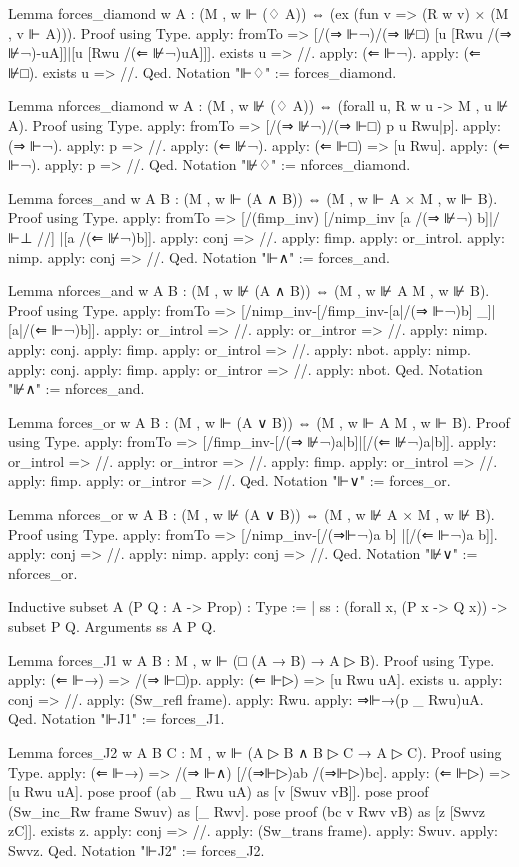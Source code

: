 \begin{spverbatim}
Lemma forces_diamond {w A} :
  (M , w ⊩ (♢ A)) ⇔ (ex (fun v => (R w v) × (M , v ⊩ A))).
Proof using Type.
  apply: fromTo => [/(⇒ ⊩¬)/(⇒ ⊮□) [u [Rwu /(⇒ ⊮¬)-uA]]|[u [Rwu /(⇐ ⊮¬)uA]]].
  exists u => //. apply: (⇐ ⊩¬). apply: (⇐ ⊮□). exists u => //.
Qed.
Notation "⊩♢" := forces_diamond.

Lemma nforces_diamond {w A} :
  (M , w ⊮ (♢ A)) ⇔ (forall {u}, R w u -> M , u ⊮ A).
Proof using Type.
  apply: fromTo => [/(⇒ ⊮¬)/(⇒ ⊩□) p u Rwu|p].
  apply: (⇒ ⊩¬). apply: p => //.
  apply: (⇐ ⊮¬). apply: (⇐ ⊩□) => [u Rwu].
  apply: (⇐ ⊩¬). apply: p => //.
Qed.
Notation "⊮♢" := nforces_diamond.

Lemma forces_and {w A B} :
  (M , w ⊩ (A ∧ B)) ⇔ (M , w ⊩ A × M , w ⊩ B).
Proof using Type.
  apply: fromTo => [/(fimp_inv) [/nimp_inv [a /(⇒ ⊮¬) b]|/⊩⊥ //]
                  |[a /(⇐ ⊮¬)b]].
  apply: conj => //.
  apply: fimp. apply: or_introl. apply: nimp. apply: conj => //.
Qed.
Notation "⊩∧" := forces_and.

Lemma nforces_and {w A B} : (M , w ⊮ (A ∧ B)) ⇔ (M , w ⊮ A \/ M , w ⊮ B).
Proof using Type.
  apply: fromTo => [/nimp_inv-[/fimp_inv-[a|/(⇒ ⊩¬)b] _]|[a|/(⇐ ⊩¬)b]].
  apply: or_introl => //. apply: or_intror => //.
  apply: nimp. apply: conj. apply: fimp. apply: or_introl => //. apply: nbot.
  apply: nimp. apply: conj. apply: fimp. apply: or_intror => //. apply: nbot.
Qed.
Notation "⊮∧" := nforces_and.

Lemma forces_or {w A B} :
  (M , w ⊩ (A ∨ B)) ⇔ (M , w ⊩ A \/ M , w ⊩ B).
Proof using Type.
  apply: fromTo => [/fimp_inv-[/(⇒ ⊮¬)a|b]|[/(⇐ ⊮¬)a|b]].
  apply: or_introl => //.
  apply: or_intror => //.
  apply: fimp. apply: or_introl => //.
  apply: fimp. apply: or_intror => //.
Qed.
Notation "⊩∨" := forces_or.

Lemma nforces_or {w A B} :
  (M , w ⊮ (A ∨ B)) ⇔ (M , w ⊮ A × M , w ⊮ B).
Proof using Type.
  apply: fromTo => [/nimp_inv-[/(⇒⊩¬)a b] |[/(⇐ ⊩¬)a b]].
  apply: conj => //.
  apply: nimp. apply: conj => //.
Qed.
Notation "⊮∨" := nforces_or.

Inductive subset {A} (P Q : A -> Prop) : Type :=
  | ss : (forall {x}, (P x -> Q x)) -> subset P Q.
Arguments ss {A} {P} {Q}.

Lemma forces_J1 {w A B} : M , w ⊩ (□ (A → B) → A ▷ B).
Proof using Type.
  apply: (⇐ ⊩→) => /(⇒ ⊩□)p.
  apply: (⇐ ⊩▷) => [u Rwu uA].
  exists u. apply: conj => //.
  apply: (Sw_refl frame). apply: Rwu.
  apply: ⇒⊩→(p _ Rwu)uA.
Qed.
Notation "⊩J1" := forces_J1.

Lemma forces_J2 {w A B C} : M , w ⊩ (A ▷ B ∧ B ▷ C → A ▷ C).
Proof using Type.
  apply: (⇐ ⊩→) => /(⇒ ⊩∧) [/(⇒⊩▷)ab /(⇒⊩▷)bc].
  apply: (⇐ ⊩▷) => [u Rwu uA].
  pose proof (ab _ Rwu uA) as [v [Swuv vB]].
  pose proof (Sw_inc_Rw frame Swuv) as [_ Rwv].
  pose proof (bc v Rwv vB) as [z [Swvz zC]].
  exists z. apply: conj => //.
  apply: (Sw_trans frame). apply: Swuv. apply: Swvz.
Qed.
Notation "⊩J2" := forces_J2.


\end{spverbatim}
